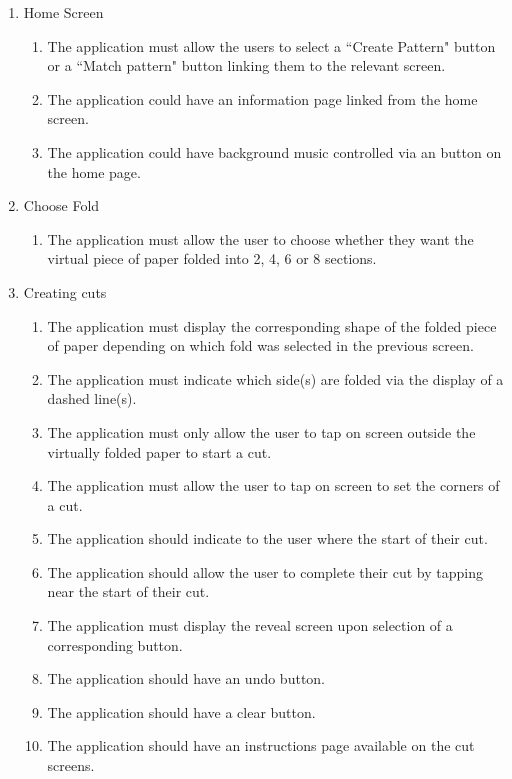 \documentclass[11pt]{article}
\begin{document}
    \begin{enumerate}
      \item Home Screen
        \begin{enumerate}[label*=\arabic*.]
        \item The application must allow the users to select a ``Create Pattern" button or a ``Match pattern" button linking them to the relevant screen.
        \item The application could have an information page linked from the home screen.
        \item The application could have background music controlled via an button on the home page.
      \end{enumerate}
      
       \item Choose Fold
        \begin{enumerate}[label*=\arabic*.]
        \item The application must allow the user to choose whether they want the virtual piece of paper folded into 2, 4, 6 or 8 sections.
      \end{enumerate}
      
      \item Creating cuts
      \begin{enumerate}[label*=\arabic*.]
        \item The application must display the corresponding shape of the folded piece of paper depending on which fold was selected in the previous screen.
        \item The application must indicate which side(s) are folded via the display of a dashed line(s).
        \item The application must only allow the user to tap on screen outside the virtually folded paper to start a cut. 
        \item The application must allow the user to tap on screen to set the corners of a cut.
        \item The application should indicate to the user where the start of their cut.
        \item The application should allow the user to complete their cut by tapping near the start of their cut. 
        \item The application must display the reveal screen upon selection of a corresponding button.  
         \item The application should have an undo button.
          \item The application should have a clear button.
        \item The application should have an instructions page available on the cut screens. 
      \end{enumerate}
      

\end{enumerate}
\end{document}
